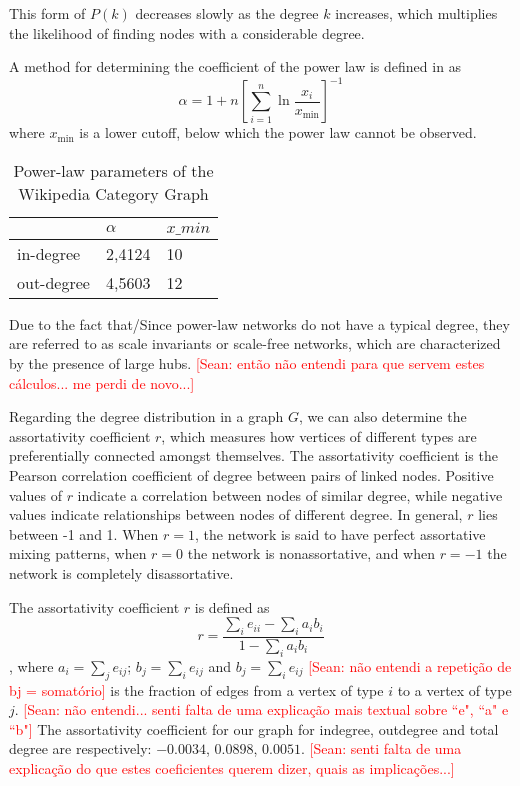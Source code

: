 This form of $P(k)$ decreases slowly as the degree $k$ increases, which multiplies the likelihood of finding nodes with a considerable degree.

A method for determining the coefficient of the power law is defined in \cite{clauset2009power} as \begin{equation}
\alpha = 1 +n\left[\sum_{i=1}^n\ln\frac{x_i}{x_{\min}}\right]^{-1}
\end{equation}
where $x_{\min}$ is a lower cutoff, below which the power law cannot be observed. 


\begin{table}[ht!]
\centering
\begin{tabular}{@{}lll@{}}
\toprule
           & $\alpha$ & $x\_{min}$ \\ \midrule
in-degree  & 2,4124 & 10         \\
out-degree & 4,5603 & 12         \\ \bottomrule
\end{tabular}
\caption{Power-law parameters of the Wikipedia Category Graph}
\label{tab:power-law-params}
\end{table}

Due to the fact that/Since power-law networks do not have a typical degree, they are referred to as scale invariants or scale-free networks, which are characterized by the presence of large hubs. \textcolor{red}{[Sean: então não entendi para que servem estes cálculos... me perdi de novo...]}

Regarding the degree distribution in a graph $G$, we can also determine the assortativity coefficient $r$, which measures how vertices of different types are preferentially connected amongst themselves. The assortativity coefficient \cite{newman2003mixing} is the Pearson correlation coefficient of degree between pairs of linked nodes. Positive values of $r$ indicate a correlation between nodes of similar degree, while negative values indicate relationships between nodes of different degree. In general, $r$ lies between -1 and 1. When $r = 1$, the network is said to have perfect assortative mixing patterns, when $r = 0$ the network is non\-assortative, and when  $r=-1$ the network is completely disassortative.

The assortativity coefficient $r$ is defined as
\begin{equation}
r = \frac{\sum_i e_{ii} - \sum_i a_i b_i}{1-\sum_i a_i b_i}
\end{equation} 
, where $a_i=\sum_je_{ij}$; $b_j=\sum_ie_{ij}$ and $b_j=\sum_ie_{ij}$ \textcolor{red}{[Sean: não entendi a repetição de bj = somatório]} is the fraction of edges from a vertex of type $i$ to a vertex of type $j$.  \textcolor{red}{[Sean: não entendi... senti falta de uma explicação mais textual sobre ``e", ``a" e ``b"]} The assortativity coefficient for our graph for indegree, outdegree and total degree are  respectively: 
$-0.0034$, $0.0898$, $0.0051$.  \textcolor{red}{[Sean: senti falta de uma explicação do que estes coeficientes querem dizer, quais as implicações...]}

